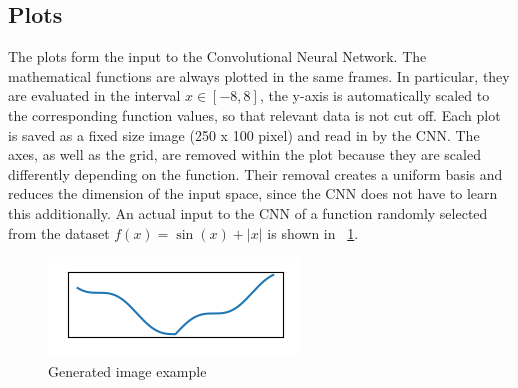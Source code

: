 \subsection{Plots}

The plots form the input to the Convolutional Neural Network. The mathematical functions are always plotted in the same frames. In particular, they are evaluated in the interval $x \in [-8,8]$, the y-axis is automatically scaled to the corresponding function values, so that relevant data is not cut off. Each plot is saved as a fixed size image (250 x 100 pixel) and read in by the CNN. The axes, as well as the grid, are removed within the plot because they are scaled differently depending on the function. Their removal creates a uniform basis and reduces the dimension of the input space, since the CNN does not have to learn this additionally. An actual input to the CNN of a function randomly selected from the dataset $f(x) = \sin(x)+|x|$ is shown in \Fig~\ref{fig:function_example}.
\begin{figure}[h!]
	\centering
	\includegraphics[width=0.4\linewidth]{./ImageFiles/Data Generation/function_example}
	\caption{Generated image example}
	\label{fig:function_example}
\end{figure}
